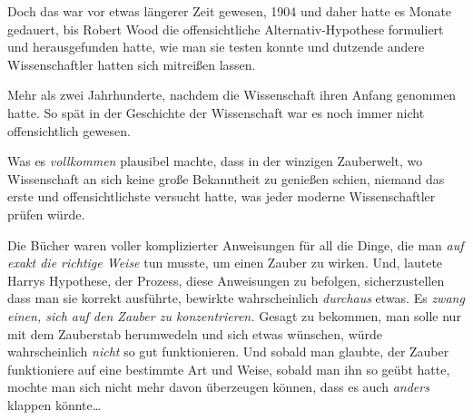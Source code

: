 Doch das war vor etwas längerer Zeit gewesen, 1904 und daher hatte es Monate gedauert, bis Robert Wood die offensichtliche Alternativ-Hypothese formuliert und herausgefunden hatte, wie man sie testen konnte und dutzende andere Wissenschaftler hatten sich mitreißen lassen.

Mehr als zwei Jahrhunderte, nachdem die Wissenschaft ihren Anfang genommen hatte. So spät in der Geschichte der Wissenschaft war es noch immer nicht offensichtlich gewesen.

Was es \emph{vollkommen} plausibel machte, dass in der winzigen Zauberwelt, wo Wissenschaft an sich keine große Bekanntheit zu genießen schien, niemand das erste und offensichtlichste versucht hatte, was jeder moderne Wissenschaftler prüfen würde.

Die Bücher waren voller komplizierter Anweisungen für all die Dinge, die man \emph{auf exakt die richtige Weise} tun musste, um einen Zauber zu wirken. Und, lautete Harrys Hypothese, der Prozess, diese Anweisungen zu befolgen, sicherzustellen dass man sie korrekt ausführte, bewirkte wahrscheinlich \emph{durchaus} etwas. Es \emph{zwang einen, sich auf den Zauber zu konzentrieren.} Gesagt zu bekommen, man solle nur mit dem Zauberstab herumwedeln und sich etwas wünschen, würde wahrscheinlich \emph{nicht} so gut funktionieren. Und sobald man glaubte, der Zauber funktioniere auf eine bestimmte Art und Weise, sobald man ihn so geübt hatte, mochte man sich nicht mehr davon überzeugen können, dass es auch \emph{anders} klappen könnte…

